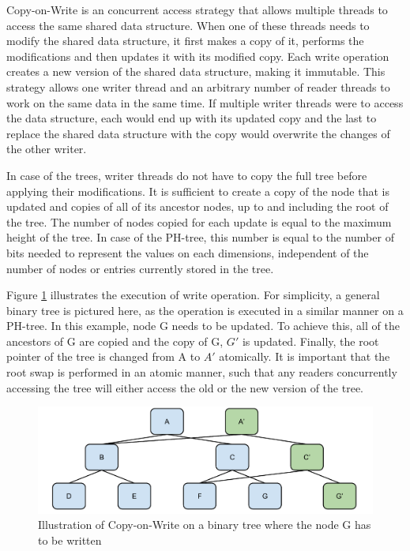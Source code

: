 \documentclass[11pt,a4paper]{globis-book}
\begin{document}
Copy-on-Write is an concurrent access strategy that allows multiple threads to access the same shared data structure. When one of these threads needs to modify the shared data structure, it first makes a copy of it, performs the modifications and then updates it with its modified copy. Each write operation creates a new version of the shared data structure, making it immutable. This strategy allows one writer thread and an arbitrary number of reader threads to work on the same data in the same time. If multiple writer threads were to access the data structure, each would end up with its updated copy and the last to replace the shared data structure with the copy would overwrite the changes of the other writer. 

In case of the trees, writer threads do not have to copy the full tree before applying their modifications. It is sufficient to create a copy of the node that is updated and copies of all of its ancestor nodes, up to and including the root of the tree. The number of nodes copied for each update is equal to the maximum height of the tree. In case of the PH-tree, this number is equal to the number of bits needed to represent the values on each dimensions, independent of the number of nodes or entries currently stored in the tree. 

Figure \ref{fig:tree-cow} illustrates the execution of write operation. For simplicity, a general binary tree is pictured here, as the operation is executed in a similar manner on a PH-tree. In this example, node G needs to be updated. To achieve this, all of the ancestors of G are copied and the copy of G, $G'$ is updated. Finally, the root pointer of the tree is changed from A to $A'$ atomically. It is important that the root swap is performed in an atomic manner, such that any readers concurrently accessing the tree will either access the old or the new version of the tree.

\begin{figure}[h]
    \centering 
    \includegraphics[scale=0.6]{images/Tree-COW}
    \caption{Illustration of Copy-on-Write on a binary tree where the node G has to be written}
    \label{fig:tree-cow}
\end{figure}
\end{document}
